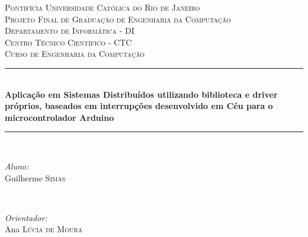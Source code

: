 \documentclass[11pt]{article}
\begin{document}
\begin{titlepage}

\newcommand{\HRule}{\rule{\linewidth}{0.5mm}} %

\center %
 

\textsc{\LARGE Pontifícia Universidade Católica do Rio de Janeiro}\\[1.5cm] %
\textsc{\Large Projeto Final de Graduação de Engenharia da Computação}\\[0.5cm] %

\textsc{\large Departamento de Informática - DI \\ Centro Técnico Científico - CTC \\ Curso de Engenharia da Computação}\\[0.5cm] %



\HRule \\[0.4cm]
{ \huge \bfseries Aplicação em Sistemas Distribuídos
utilizando biblioteca e driver próprios,
baseados em interrupções desenvolvido
em Céu para o microcontrolador Arduino}\\[0.4cm] %
\HRule \\[1.5cm]
 

\begin{minipage}{0.4\textwidth}
\begin{flushleft} \large
\emph{Aluno:}\\
Guilherme \textsc{Simas} %
\end{flushleft}
\end{minipage}
~
\begin{minipage}{0.4\textwidth}
\begin{flushright} \large
\emph{Orientador:} \\
Ana \textsc{Lúcia de Moura} %
\end{flushright}
\end{minipage}\\[4cm]


\end{titlepage}
\end{document}
